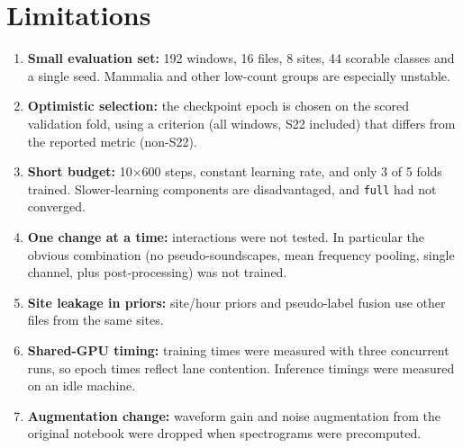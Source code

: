 \documentclass[11pt]{article}
\newcommand{\var}[1]{\texttt{#1}}
\begin{document}
\section{Limitations}
\begin{enumerate}
  \item \textbf{Small evaluation set:} 192 windows, 16 files, 8 sites, 44
        scorable classes and a single seed. Mammalia and other low-count
        groups are especially unstable.
  \item \textbf{Optimistic selection:} the checkpoint epoch is chosen on the
        scored validation fold, using a criterion (all windows, S22 included)
        that differs from the reported metric (non-S22).
  \item \textbf{Short budget:} 10$\times$600 steps, constant learning rate,
        and only 3 of 5 folds trained. Slower-learning components are
        disadvantaged, and \var{full} had not converged.
  \item \textbf{One change at a time:} interactions were not tested. In
        particular the obvious combination (no pseudo-soundscapes, mean
        frequency pooling, single channel, plus post-processing) was not
        trained.
  \item \textbf{Site leakage in priors:} site/hour priors and pseudo-label
        fusion use other files from the same sites.
  \item \textbf{Shared-GPU timing:} training times were measured with three
        concurrent runs, so epoch times reflect lane contention. Inference
        timings were measured on an idle machine.
  \item \textbf{Augmentation change:} waveform gain and noise augmentation
        from the original notebook were dropped when spectrograms were
        precomputed.
\end{enumerate}

\end{document}
